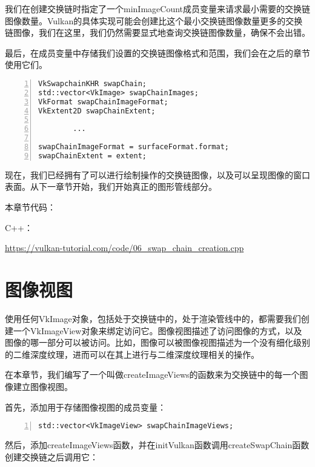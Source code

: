 \documentclass{ctexart}
\begin{document}
我们在创建交换链时指定了一个minImageCount成员变量来请求最小需要的交换链图像数量。Vulkan的具体实现可能会创建比这个最小交换链图像数量更多的交换链图像，我们在这里，我们仍然需要显式地查询交换链图像数量，确保不会出错。

最后，在成员变量中存储我们设置的交换链图像格式和范围，我们会在之后的章节使用它们。

\begin{lstlisting}[language={[ANSI]C},keywordstyle=\color{blue!70},commentstyle=\color{red!50!green!50!blue!50},frame=shadowbox, rulesepcolor=\color{red!20!green!20!blue!20},basicstyle=\small,numbers=left, numberstyle=\tiny,breaklines=true]
VkSwapchainKHR swapChain;
std::vector<VkImage> swapChainImages;
VkFormat swapChainImageFormat;
VkExtent2D swapChainExtent;

		...

swapChainImageFormat = surfaceFormat.format;
swapChainExtent = extent;
\end{lstlisting}

现在，我们已经拥有了可以进行绘制操作的交换链图像，以及可以呈现图像的窗口表面。从下一章节开始，我们开始真正的图形管线部分。

本章节代码：

C++：

\url{https://vulkan-tutorial.com/code/06_swap_chain_creation.cpp}

\newpage
\section{图像视图}

使用任何VkImage对象，包括处于交换链中的，处于渲染管线中的，都需要我们创建一个VkImageView对象来绑定访问它。图像视图描述了访问图像的方式，以及图像的哪一部分可以被访问。比如，图像可以被图像视图描述为一个没有细化级别的二维深度纹理，进而可以在其上进行与二维深度纹理相关的操作。

在本章节，我们编写了一个叫做createImageViews的函数来为交换链中的每一个图像建立图像视图。

首先，添加用于存储图像视图的成员变量：

\begin{lstlisting}[language={[ANSI]C},keywordstyle=\color{blue!70},commentstyle=\color{red!50!green!50!blue!50},frame=shadowbox, rulesepcolor=\color{red!20!green!20!blue!20},basicstyle=\small,numbers=left, numberstyle=\tiny,breaklines=true]
std::vector<VkImageView> swapChainImageViews;
\end{lstlisting}

然后，添加createImageViews函数，并在initVulkan函数调用createSwapChain函数创建交换链之后调用它：
\end{document}
